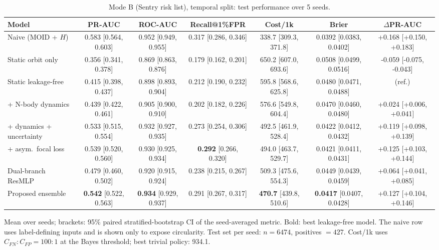 \begin{table}[t]
\centering
\small
\caption{Mode B (Sentry risk list), temporal split: test performance over 5 seeds.}
\label{tab:sentry_temporal_all}
\begin{tabular}{lcccccc}
\toprule
Model & PR-AUC & ROC-AUC & Recall@1\%FPR & Cost/1k & Brier & $\Delta$PR-AUC \\
\midrule
Naive (MOID + $H$) & 0.583 \scriptsize{[0.564, 0.603]} & 0.952 \scriptsize{[0.949, 0.955]} & 0.317 \scriptsize{[0.286, 0.346]} & 338.7 \scriptsize{[309.3, 371.8]} & 0.0392 \scriptsize{[0.0383, 0.0402]} & +0.168 \scriptsize{[+0.150, +0.183]} \\
\midrule
Static orbit only & 0.356 \scriptsize{[0.341, 0.378]} & 0.869 \scriptsize{[0.863, 0.876]} & 0.179 \scriptsize{[0.162, 0.201]} & 650.2 \scriptsize{[607.0, 693.6]} & 0.0508 \scriptsize{[0.0499, 0.0516]} & -0.059 \scriptsize{[-0.075, -0.043]} \\
Static leakage-free & 0.415 \scriptsize{[0.398, 0.437]} & 0.898 \scriptsize{[0.893, 0.904]} & 0.212 \scriptsize{[0.190, 0.232]} & 595.8 \scriptsize{[568.6, 625.8]} & 0.0480 \scriptsize{[0.0471, 0.0488]} & (ref.) \\
+ N-body dynamics & 0.439 \scriptsize{[0.422, 0.461]} & 0.905 \scriptsize{[0.900, 0.910]} & 0.202 \scriptsize{[0.182, 0.226]} & 576.6 \scriptsize{[549.8, 604.4]} & 0.0470 \scriptsize{[0.0460, 0.0480]} & +0.024 \scriptsize{[+0.006, +0.041]} \\
+ dynamics + uncertainty & 0.533 \scriptsize{[0.515, 0.554]} & 0.932 \scriptsize{[0.927, 0.935]} & 0.273 \scriptsize{[0.254, 0.306]} & 492.5 \scriptsize{[461.9, 528.4]} & 0.0422 \scriptsize{[0.0412, 0.0432]} & +0.119 \scriptsize{[+0.098, +0.139]} \\
+ asym.\ focal loss & 0.539 \scriptsize{[0.520, 0.560]} & 0.930 \scriptsize{[0.925, 0.934]} & \textbf{0.292} \scriptsize{[0.266, 0.320]} & 494.0 \scriptsize{[463.7, 529.7]} & 0.0421 \scriptsize{[0.0411, 0.0431]} & +0.125 \scriptsize{[+0.103, +0.144]} \\
Dual-branch ResMLP & 0.479 \scriptsize{[0.460, 0.502]} & 0.920 \scriptsize{[0.915, 0.924]} & 0.238 \scriptsize{[0.215, 0.267]} & 509.3 \scriptsize{[475.6, 554.3]} & 0.0449 \scriptsize{[0.0439, 0.0459]} & +0.064 \scriptsize{[+0.041, +0.085]} \\
Proposed ensemble & \textbf{0.542} \scriptsize{[0.522, 0.563]} & \textbf{0.934} \scriptsize{[0.929, 0.937]} & 0.291 \scriptsize{[0.267, 0.317]} & \textbf{470.7} \scriptsize{[439.8, 510.6]} & \textbf{0.0417} \scriptsize{[0.0407, 0.0428]} & +0.127 \scriptsize{[+0.104, +0.146]} \\
\bottomrule
\end{tabular}
\par\vspace{2pt}\footnotesize Mean over seeds; brackets: 95\% paired stratified-bootstrap CI of the seed-averaged metric. Bold: best leakage-free model. The naive row uses label-defining inputs and is shown only to expose circularity. Test set per seed: $n=6474$, positives $=427$. Cost/1k uses $C_{FN}{:}C_{FP}=100{:}1$ at the Bayes threshold; best trivial policy: 934.1.
\end{table}
